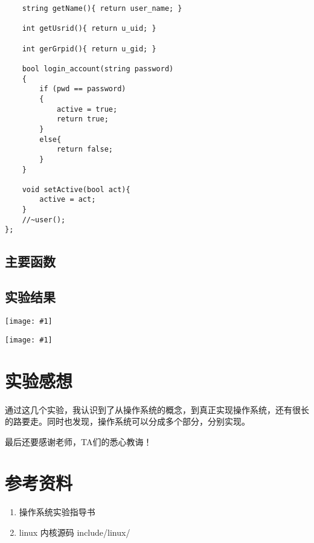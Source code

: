 \documentclass{article}
\newcommand{\incpng}[1]{\texttt{[image: \#1]}}
\begin{document}
\begin{CJK}{UTF8}{gkai}
\begin{lstlisting}
	string getName(){ return user_name; }

	int getUsrid(){ return u_uid; }

	int gerGrpid(){ return u_gid; }

	bool login_account(string password)
	{
		if (pwd == password)
		{
			active = true;
			return true;
		}
		else{
			return false;
		}
	}

	void setActive(bool act){
		active = act;
	}
	//~user();
};
\end{lstlisting}

\subsection{主要函数}

%

\subsection{实验结果}
\incpng{../fs}

\incpng{../file}

\section{实验感想}
通过这几个实验，我认识到了从操作系统的概念，到真正实现操作系统，还有很长的路要走。同时也发现，操作系统可以分成多个部分，分别实现。

最后还要感谢老师，TA们的悉心教诲！

\section*{参考资料}
\begin{enumerate}
\item 操作系统实验指导书
\item linux 内核源码 include/linux/
\end{enumerate}



\end{CJK}
\end{document}
